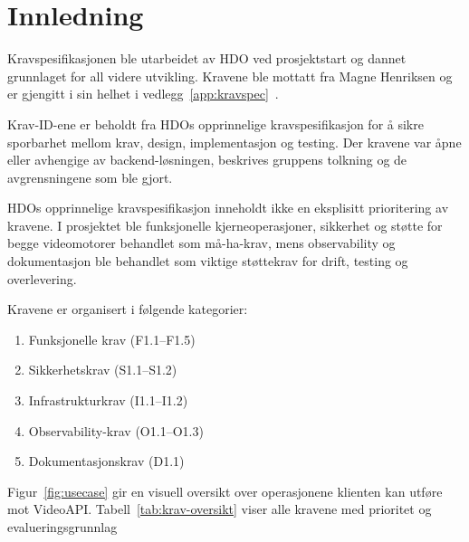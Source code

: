 \section{Innledning}
\label{sec:krav-innledning}

Kravspesifikasjonen ble utarbeidet av HDO ved prosjektstart og dannet grunnlaget for all videre utvikling. Kravene ble mottatt fra Magne Henriksen og er gjengitt i sin helhet i vedlegg~\ref{app:kravspec}~\cite{hdo_kravspec}.

Krav-ID-ene er beholdt fra HDOs opprinnelige kravspesifikasjon for å sikre sporbarhet mellom krav, design, implementasjon og testing. Der kravene var åpne eller avhengige av backend-løsningen, beskrives gruppens tolkning og de avgrensningene som ble gjort.

HDOs opprinnelige kravspesifikasjon inneholdt ikke en eksplisitt prioritering av kravene. I prosjektet ble funksjonelle kjerneoperasjoner, sikkerhet og støtte for begge videomotorer behandlet som må-ha-krav, mens observability og dokumentasjon ble behandlet som viktige støttekrav for drift, testing og overlevering.

Kravene er organisert i følgende kategorier:
\begin{enumerate}
    \item Funksjonelle krav (F1.1--F1.5)
    \item Sikkerhetskrav (S1.1--S1.2)
    \item Infrastrukturkrav (I1.1--I1.2)
    \item Observability-krav (O1.1--O1.3)
    \item Dokumentasjonskrav (D1.1)
\end{enumerate}

Figur~\ref{fig:usecase} gir en visuell oversikt over operasjonene klienten kan utføre mot VideoAPI. Tabell~\ref{tab:krav-oversikt} viser alle kravene med prioritet og evalueringsgrunnlag

